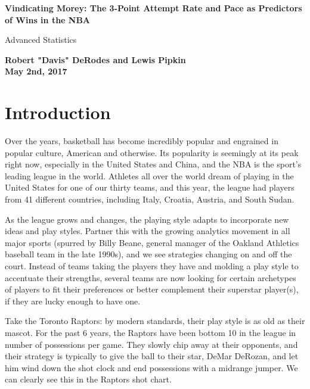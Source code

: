 \documentclass[12pt]{article}
\begin{document}
\begin{titlepage}
    \begin{center}
        \vspace*{1cm}
        \textbf{Vindicating Morey: The 3-Point Attempt Rate and Pace as Predictors of Wins in the NBA
}
        
        \vspace{0.5cm}
        Advanced Statistics
        
        \vspace{1.5cm}
        
        \textbf{Robert "Davis" DeRodes and Lewis Pipkin}\\
        \textbf{May 2nd, 2017}\\
        
        \vfill
                
    \end{center}
\end{titlepage}
\section{Introduction}
	\indent Over the years, basketball has become incredibly popular and engrained in popular culture, American and otherwise. Its popularity is seemingly at its peak right now, especially in the United States and China, and the NBA is the sport's leading league in the world. Athletes all over the world dream of playing in the United States for one of our thirty teams, and this year, the league had players from 41 different countries, including Italy, Croatia, Austria, and South Sudan.\par
As the league grows and changes, the playing style adapts to incorporate new ideas and play styles. Partner this with the growing analytics movement in all major sports (spurred by Billy Beane, general manager of the Oakland Athletics baseball team in the late 1990s), and we see strategies changing on and off the court. Instead of teams taking the players they have and molding a play style to accentuate their strengths, several teams are now looking for certain archetypes of players to fit their preferences or better complement their superstar player(s), if they are lucky enough to have one. \par 
Take the Toronto Raptors: by modern standards, their play style is as old as their mascot. For the past 6 years, the Raptors have been bottom 10 in the league in number of possessions per game. They slowly chip away at their opponents, and their strategy is typically to give the ball to their star, DeMar DeRozan, and let him wind down the shot clock and end possessions with a midrange jumper. We can clearly see this in the Raptors shot chart.\par
\end{document}
